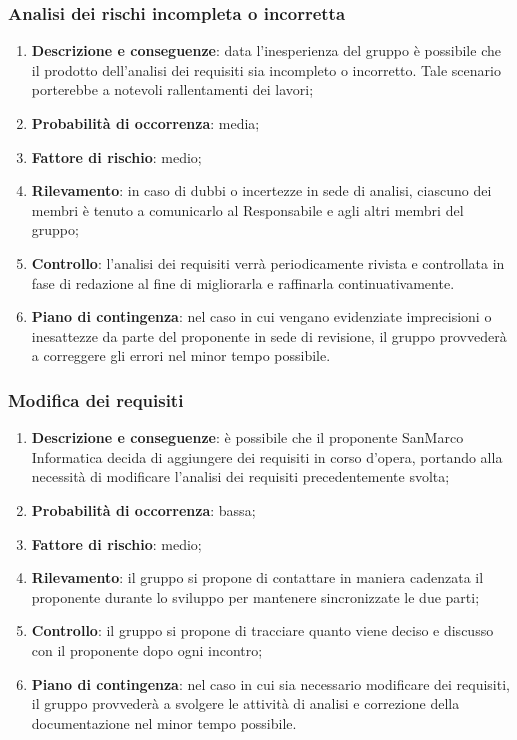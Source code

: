 	\subsubsection{Analisi dei rischi incompleta o incorretta}
	\begin{enumerate}
		\item \textbf{Descrizione e conseguenze}: data l'inesperienza del gruppo è possibile che il prodotto dell'analisi dei requisiti sia incompleto o incorretto. Tale scenario porterebbe a notevoli rallentamenti dei lavori;
		\item \textbf{Probabilità di occorrenza}: media;
		\item \textbf{Fattore di rischio}: medio;
		\item \textbf{Rilevamento}: in caso di dubbi o incertezze in sede di analisi, ciascuno dei membri è tenuto a comunicarlo al Responsabile e agli altri membri del gruppo;		
		\item \textbf{Controllo}: l'analisi dei requisiti verrà periodicamente rivista e controllata in fase di redazione al fine di migliorarla e raffinarla continuativamente.
		\item \textbf{Piano di contingenza}: nel caso in cui vengano evidenziate imprecisioni o inesattezze da parte del proponente in sede di revisione, il gruppo provvederà a correggere gli errori nel minor tempo possibile.
	\end{enumerate}
	
	\subsubsection{Modifica dei requisiti}
	\begin{enumerate}
		\item \textbf{Descrizione e conseguenze}: è possibile che il proponente SanMarco Informatica decida di aggiungere dei requisiti in corso d'opera, portando alla necessità di modificare l'analisi dei requisiti precedentemente svolta; 
		\item \textbf{Probabilità di occorrenza}: bassa;
		\item \textbf{Fattore di rischio}: medio;
		\item \textbf{Rilevamento}: il gruppo si propone di contattare in maniera cadenzata il proponente durante lo sviluppo per mantenere sincronizzate le due parti;
		\item \textbf{Controllo}: il gruppo si propone di tracciare quanto viene deciso e discusso con il proponente dopo ogni incontro;
		\item \textbf{Piano di contingenza}: nel caso in cui sia necessario modificare dei requisiti, il gruppo provvederà a svolgere le attività di analisi e correzione della documentazione nel minor tempo possibile.
	\end{enumerate}	
	
